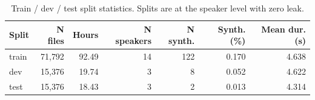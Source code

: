 \begin{table}[!t]
  \centering
  \caption{Train / dev / test split statistics. Splits are at the
           speaker level with zero leak.}
  \label{tab:per_split}
  \small
  \begin{tabular}{lrrrrrr}
  \toprule
  Split & N files & Hours & N speakers & N synth. & Synth. (\%) & Mean dur. (s) \\
  \midrule
  train & 71{,}792 & 92.49 & 14 & 122 & 0.170 & 4.638 \\
  dev   & 15{,}376 & 19.74 &  3 &   8 & 0.052 & 4.622 \\
  test  & 15{,}376 & 18.43 &  3 &   2 & 0.013 & 4.314 \\
  \bottomrule
  \end{tabular}
\end{table}
